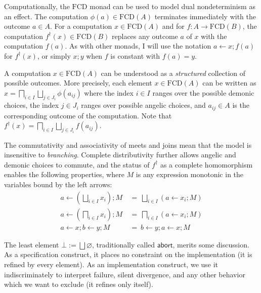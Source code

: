 \documentclass[11pt,oneside]{book}
\theoremstyle{definition}
\newcommand{\kw}[1]{\ensuremath{ \mathsf{#1} }}
\begin{document}
Computationally,
the $\mathrm{FCD}$ monad can be used to model
dual nondeterminism as an effect.
The computation
$\phi(a) \in \mathrm{FCD}(A)$
terminates immediately with the outcome $a \in A$.
For a computation $x \in \mathrm{FCD}(A)$
and for $f : A \rightarrow \mathrm{FCD}(B)$,
the computation $f^\dagger(x) \in \mathrm{FCD}(B)$
replaces
any outcome $a$ of $x$ with the computation $f(a)$.
As with other monads,
I will use the notation
$a \leftarrow x ; f(a)$ for $f^\dagger(x)$,
or simply $x ; y$ when $f$ is constant with $f(a) = y$.

A computation $x \in \mathrm{FCD}(A)$
can be understood as
a \emph{structured} collection of possible outcomes.
More precisely,
each element $x \in \mathrm{FCD}(A)$ can be written as
$
    x = \bigsqcap_{i \in I} \bigsqcup_{j \in J_i} \phi(a_{ij})
$
where
the index $i \in I$ ranges over the possible demonic choices,
the index $j \in J_i$ ranges over possible angelic choices,
and $a_{ij} \in A$ is the corresponding outcome of the computation.
Note that
$f^\dagger(x) = \bigsqcap_{i \in I} \bigsqcup_{j \in J_i} f(a_{ij})$.

The commutativity and associativity of meets and joins
mean that the model is insensitive to \emph{branching}.
Complete distributivity
further allows angelic and demonic choices to commute,
and the status of $f^\dagger$ as a complete homomorphism
enables the following properties,
where $M$ is any expression monotonic in the variables
bound by the left arrows:
\begin{align*}
    a \leftarrow \left( \bigsqcup_{i \in I} x_i \right) \mathbin{;} M \: &= \:
      \bigsqcup_{i \in I} (a \leftarrow x_i \mathbin{;} M)
    \\
    a \leftarrow \left( \bigsqcap_{i \in I} x_i \right) \mathbin{;} M \: &= \:
      \bigsqcap_{i \in I} (a \leftarrow x_i \mathbin{;} M)
    \\
    a \leftarrow x \mathbin{;} b \leftarrow y \mathbin{;} M \: &= \:
    b \leftarrow y \mathbin{;} a \leftarrow x \mathbin{;} M
\end{align*}

The least element $\bot := \bigsqcup \varnothing$,
traditionally called $\kw{abort}$,
merits some discussion.
As a specification construct,
it places no constraint on the implementation
(it is refined by every element).
As an implementation construct,
we use it indiscriminately to interpret
failure, silent divergence,
and any other behavior
which we want to exclude (it refines only itself).
\end{document}
